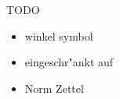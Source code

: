 \documentclass[class=article, crop=false]{standalone}
\begin{document}
\begin{zettel}{TODO}
    \begin{itemize}
        \item winkel symbol
        \item eingeschr"ankt auf
        \item Norm Zettel
    \end{itemize}
\end{zettel}
\end{document}
